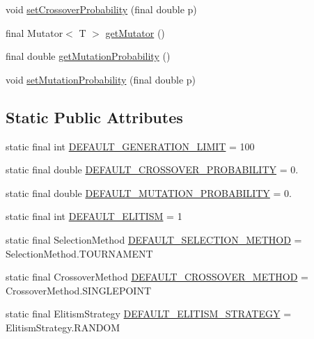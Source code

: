 \begin{DoxyCompactItemize}
\item 
void \hyperlink{classjenes_1_1algorithms_1_1_simple_g_a_3_01_t_01extends_01_chromosome_01_4_a639f43de8d71ae3e28077c4510eae64e}{set\-Crossover\-Probability} (final double p)
\item 
final Mutator$<$ T $>$ \hyperlink{classjenes_1_1algorithms_1_1_simple_g_a_3_01_t_01extends_01_chromosome_01_4_af1b77602d4f2440c2abde1f8a9d336e7}{get\-Mutator} ()
\item 
final double \hyperlink{classjenes_1_1algorithms_1_1_simple_g_a_3_01_t_01extends_01_chromosome_01_4_a0f8be347c9405a5b82d7a10678fc9a3a}{get\-Mutation\-Probability} ()
\item 
void \hyperlink{classjenes_1_1algorithms_1_1_simple_g_a_3_01_t_01extends_01_chromosome_01_4_a2ce1369d995dc328caa6b542e24e55f6}{set\-Mutation\-Probability} (final double p)
\end{DoxyCompactItemize}
\subsection*{Static Public Attributes}
\begin{DoxyCompactItemize}
\item 
static final int \hyperlink{classjenes_1_1algorithms_1_1_simple_g_a_3_01_t_01extends_01_chromosome_01_4_ac4060f400a4a9d81185713c244699d40}{D\-E\-F\-A\-U\-L\-T\-\_\-\-G\-E\-N\-E\-R\-A\-T\-I\-O\-N\-\_\-\-L\-I\-M\-I\-T} = 100
\item 
static final double \hyperlink{classjenes_1_1algorithms_1_1_simple_g_a_3_01_t_01extends_01_chromosome_01_4_a6bb4783aa44abaae39375ae762412fa3}{D\-E\-F\-A\-U\-L\-T\-\_\-\-C\-R\-O\-S\-S\-O\-V\-E\-R\-\_\-\-P\-R\-O\-B\-A\-B\-I\-L\-I\-T\-Y} = 0.
\item 
static final double \hyperlink{classjenes_1_1algorithms_1_1_simple_g_a_3_01_t_01extends_01_chromosome_01_4_a6b93f23c518016295e31b02aa7ef1f8c}{D\-E\-F\-A\-U\-L\-T\-\_\-\-M\-U\-T\-A\-T\-I\-O\-N\-\_\-\-P\-R\-O\-B\-A\-B\-I\-L\-I\-T\-Y} = 0.
\item 
static final int \hyperlink{classjenes_1_1algorithms_1_1_simple_g_a_3_01_t_01extends_01_chromosome_01_4_a3b820957538efb558e8240e996d503cd}{D\-E\-F\-A\-U\-L\-T\-\_\-\-E\-L\-I\-T\-I\-S\-M} = 1
\item 
static final Selection\-Method \hyperlink{classjenes_1_1algorithms_1_1_simple_g_a_3_01_t_01extends_01_chromosome_01_4_a93d44174d00fdf0a8ebedfa3badcde66}{D\-E\-F\-A\-U\-L\-T\-\_\-\-S\-E\-L\-E\-C\-T\-I\-O\-N\-\_\-\-M\-E\-T\-H\-O\-D} = Selection\-Method.\-T\-O\-U\-R\-N\-A\-M\-E\-N\-T
\item 
static final Crossover\-Method \hyperlink{classjenes_1_1algorithms_1_1_simple_g_a_3_01_t_01extends_01_chromosome_01_4_a568bc71d97e1221ff4c7a4cc2b9a938d}{D\-E\-F\-A\-U\-L\-T\-\_\-\-C\-R\-O\-S\-S\-O\-V\-E\-R\-\_\-\-M\-E\-T\-H\-O\-D} = Crossover\-Method.\-S\-I\-N\-G\-L\-E\-P\-O\-I\-N\-T
\item 
static final Elitism\-Strategy \hyperlink{classjenes_1_1algorithms_1_1_simple_g_a_3_01_t_01extends_01_chromosome_01_4_ab95f26a5f33145a73eed2832becb962f}{D\-E\-F\-A\-U\-L\-T\-\_\-\-E\-L\-I\-T\-I\-S\-M\-\_\-\-S\-T\-R\-A\-T\-E\-G\-Y} = Elitism\-Strategy.\-R\-A\-N\-D\-O\-M
\end{DoxyCompactItemize}


